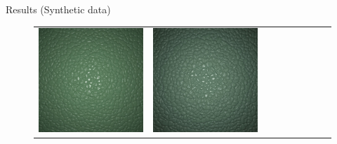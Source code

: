 \documentclass[final]{beamer}
\newlength{\twocolwid}
\newlength{\resultwidth}
\begin{document}
\begin{frame}[t]
\begin{columns}[t]
\begin{column}{\twocolwid}
\begin{block}{Results (Synthetic data)}
\begin{figure}[t]
\begin{tabular}{ccrclcccc}
            		\includegraphics[width=\resultwidth]{synth/leather/good3.jpg} &
            		\includegraphics[width=\resultwidth]{synth/leather/bad1.jpg}
            		\\

\end{tabular}
\end{figure}
\end{block}
\end{column}
\end{columns}
\end{frame}
\end{document}
